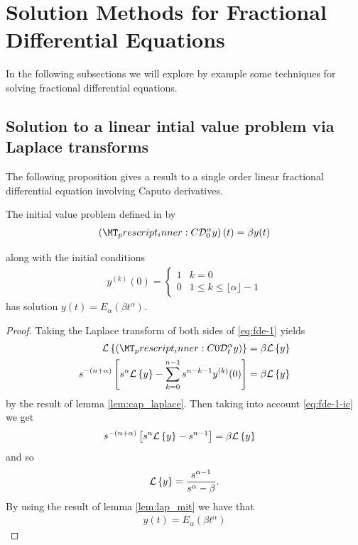 \section{Solution Methods for Fractional Differential Equations}

In the following subsections we will explore by example some techniques for solving fractional differential equations.

\subsection{Solution to a linear intial value problem via Laplace transforms}
The following proposition gives a result to a single order linear fractional differential equation involving Caputo derivatives.
\begin{mdframed}[innertopmargin=10pt]
\begin{proposition}

	The initial value problem defined in by
	\begin{align}
        \label{eq:fde-1}
        \left( \prescript{C}{}{\mathcal{D}_0^\alpha}y \right)(t) = \beta y(t)
    \end{align}
    
    along with the initial conditions
    \begin{align}
        \label{eq:fde-1-ic}
        y^{(k)}(0) =
        \begin{cases}
        1 & k = 0 \\
        0 & 1 \leq k \leq \lfloor\alpha \rfloor - 1
        \end{cases}
    \end{align}
	has solution $ y(t) = E_\alpha \left( \beta t^\alpha \right) $.
\end{proposition}
\end{mdframed}
\begin{proof}
	Taking the Laplace transform of both sides of \eqref{eq:fde-1} yields
	\begin{align*}
		\laplace{\capder{0}{t}{\alpha}{y}} &= \beta \laplace{y} \\
		s^{-(n+\alpha)} \left[s^n \laplace{y} - \sum_{k=0}^{n-1} s^{n-k-1} y^{(k)}(0) \right] &= \beta \laplace{y}
	\end{align*}
	by the result of lemma \ref{lem:cap_laplace}. 
	Then taking into account \eqref{eq:fde-1-ic} we get
	\begin{align*}
		s^{-(n+\alpha)} \left[s^n \mathcal{L} \left\{ y \right\} - s^{n-1}\right] &= \beta \mathcal{L} \left\{ y \right\}
	\end{align*}
	and so 
	\begin{align*}
		\mathcal{L} \left\{ y \right\} = \frac{s^{\alpha-1}}{s^\alpha - \beta}.
	\end{align*}
	By using the result of lemma \ref{lem:lap_mit} we have that 
	\begin{align*}
		y(t) = E_\alpha(\beta t^\alpha)
	\end{align*}
\end{proof}
